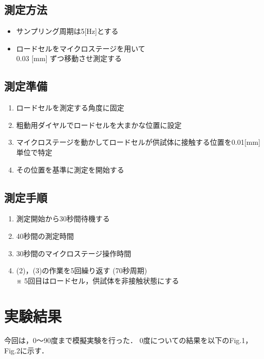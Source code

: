 \documentclass[twocolumn,a4j]{jsarticle}
\begin{document}
\subsection{測定方法}
\begin{itemize}
    \item サンプリング周期は5[Hz]とする
    \item ロードセルをマイクロステージを用いて\\0.03 [mm] ずつ移動させ測定する
\end{itemize}

\subsection{測定準備}
\begin{screen}
    \begin{enumerate}[(1)]
        \item ロードセルを測定する角度に固定
        \item 粗動用ダイヤルでロードセルを大まかな位置に設定
        \item マイクロステージを動かしてロードセルが供試体に接触する位置を0.01[mm]単位で特定
        \item その位置を基準に測定を開始する
    \end{enumerate}
\end{screen}

\subsection{測定手順}
\begin{screen}
    \begin{enumerate}[(1)]
        \item 測定開始から30秒間待機する
        \item 40秒間の測定時間
        \item 30秒間のマイクロステージ操作時間
        \item (2)，(3)の作業を5回繰り返す (70秒周期)\\
              ※ 5回目はロードセル，供試体を非接触状態にする
    \end{enumerate}
\end{screen}

\section{実験結果}
今回は，0～90度まで模擬実験を行った．
0度についての結果を以下のFig.1，Fig.2に示す．
\end{document}

